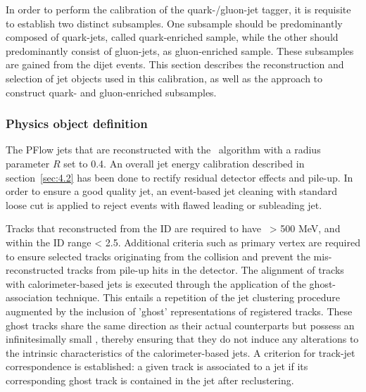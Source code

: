 In order to perform the calibration of the quark-/gluon-jet tagger, it is requisite to establish two distinct subsamples. One subsample should be predominantly composed of quark-jets, called quark-enriched sample, while the other should predominantly consist of gluon-jets, as gluon-enriched sample. These subsamples are gained from the dijet events. This section describes the reconstruction and selection of jet objects used in this calibration, as well as the approach to construct quark- and gluon-enriched subsamples.

\subsubsection{Physics object definition}
\label{subsec:obj}

The PFlow jets that are reconstructed with the \antikt~algorithm with a radius parameter $R$ set to 0.4. An overall jet energy calibration described in section~\ref{sec:4.2} has been done to rectify residual detector effects and pile-up. In order to ensure a good quality jet, an event-based jet cleaning with standard loose cut is applied to reject events with flawed leading or subleading jet.

Tracks that reconstructed from the ID are required to have \pt~> 500 MeV, and within the ID range \abseta < 2.5. Additional criteria such as primary vertex are required to ensure selected tracks originating from the collision and prevent the mis-reconstructed tracks from pile-up hits in the detector. The alignment of tracks with calorimeter-based jets is executed through the application of the ghost-association technique. This entails a repetition of the jet clustering procedure augmented by the inclusion of 'ghost' representations of registered tracks. These ghost tracks share the same direction as their actual counterparts but possess an infinitesimally small \pt, thereby ensuring that they do not induce any alterations to the intrinsic characteristics of the calorimeter-based jets. A criterion for track-jet correspondence is established: a given track is associated to a jet if its corresponding ghost track is contained in the jet after reclustering.


